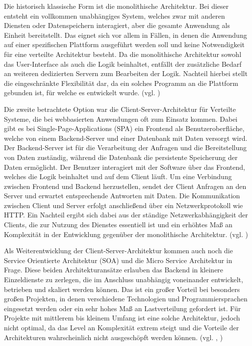 Die historisch klassische Form ist die monolithische Architektur. Bei dieser entsteht ein vollkommen unabhängiges System, welches zwar mit anderen Diensten oder Datenspeichern interagiert, aber die gesamte Anwendung als Einheit bereitstellt. Das eignet sich vor allem in Fällen, in denen die Anwendung auf einer spezifischen Plattform ausgeführt werden soll und keine Notwendigkeit für eine verteilte Architektur besteht. Da die monolithische Architektur sowohl das User-Interface als auch die Logik beinhaltet, entfällt der zusätzliche Bedarf an weiteren dedizierten Servern zum Bearbeiten der Logik. Nachteil hierbei stellt die eingeschränkte Flexibilität dar, da ein solches Programm an die Plattform gebunden ist, für welche es entwickelt wurde. (vgl. \cite{Architekturen})

Die zweite betrachtete Option war die Client-Server-Architektur für Verteilte Systeme, die bei webbasierten Anwendungen oft zum Einsatz kommen. Dabei gibt es \zB bei Single-Page-Applications (SPA) ein Frontend als Benutzeroberfläche, welche von einem Backend-Server und einer Datenbank mit Daten versorgt wird. Der Backend-Server ist für die Verarbeitung der Anfragen und die Bereitstellung von Daten zuständig, während die Datenbank die persistente Speicherung der Daten ermöglicht. Der Benutzer interagiert mit der Software über das Frontend, welches die Logik beinhaltet und auf dem Client läuft. Um eine Verbindung zwischen Frontend und Backend herzustellen, sendet der Client Anfragen an den Server und erwartet entsprechende Antworten mit Daten. Die Kommunikation zwischen Client und Server erfolgt anschließend über ein Netzwerkprotokoll wie HTTP. Ein Nachteil ergibt sich dabei aus der ständige Netzwerkabhängigkeit der Clients, die zur Nutzung des Dienstes essentiell ist und ein erhöhtes Maß an Komplexität in der Entwicklung gegenüber der monolithische Architektur. (vgl. \cite{SPA})

Als Weiterentwicklung der Client-Server-Architektur kommen auch noch die Service Orientierte Architektur (SOA) und die Micro Service Architektur in Frage. Diese beiden Architekturansätze erlauben das Backend in kleinere Einzeldienste zu zerlegen, die im Anschluss unabhängig voneinander entwickelt, betrieben und skaliert werden können. Das ist ein großer Vorteil bei besonders großen Projekten, in denen verschiedene Technologien und Programmiersprachen eingesetzt werden oder ein sehr hohes Maß an Lastverteilung gefordert ist. Für Projekte mit mittlerem bis kleinem Umfang ist eine solche Architektur, jedoch nicht optimal, da das Level an Komplexität extrem steigt und die Vorteile der Architekturen wahrscheinlich nicht ausgeschöpft werden können. (vgl. \cite{SOA}, \cite{Micro})

